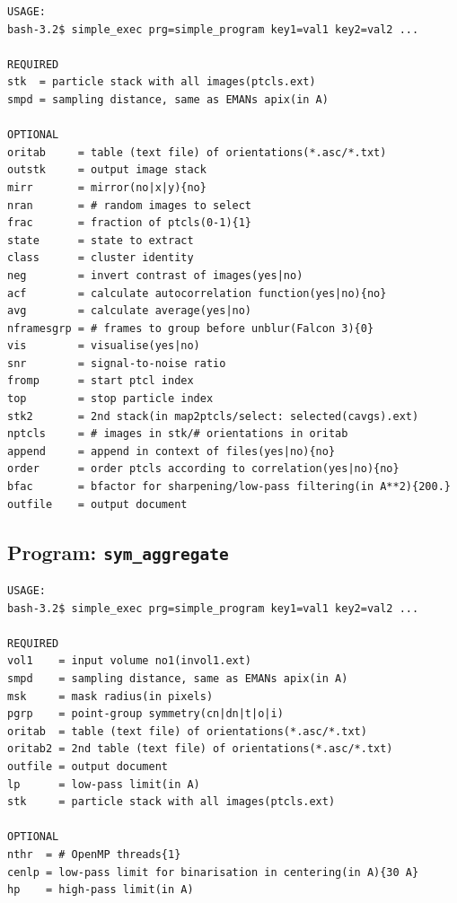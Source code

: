 \documentclass[a4paper,11pt]{article}
\newcommand{\prgname}[1]{\textcolor{NavyBlue}{\texttt{#1}}}
\begin{document}
\begin{verbatim}
USAGE:
bash-3.2$ simple_exec prg=simple_program key1=val1 key2=val2 ...

REQUIRED
stk  = particle stack with all images(ptcls.ext)
smpd = sampling distance, same as EMANs apix(in A)

OPTIONAL
oritab     = table (text file) of orientations(*.asc/*.txt)
outstk     = output image stack
mirr       = mirror(no|x|y){no}
nran       = # random images to select
frac       = fraction of ptcls(0-1){1}
state      = state to extract
class      = cluster identity
neg        = invert contrast of images(yes|no)
acf        = calculate autocorrelation function(yes|no){no}
avg        = calculate average(yes|no)
nframesgrp = # frames to group before unblur(Falcon 3){0}
vis        = visualise(yes|no)
snr        = signal-to-noise ratio
fromp      = start ptcl index
top        = stop particle index
stk2       = 2nd stack(in map2ptcls/select: selected(cavgs).ext)
nptcls     = # images in stk/# orientations in oritab
append     = append in context of files(yes|no){no}
order      = order ptcls according to correlation(yes|no){no}
bfac       = bfactor for sharpening/low-pass filtering(in A**2){200.}
outfile    = output document
\end{verbatim}

\subsection{Program: \prgname{sym\_aggregate}}
\label{sym_aggregate}
\begin{verbatim}
USAGE:
bash-3.2$ simple_exec prg=simple_program key1=val1 key2=val2 ...

REQUIRED
vol1    = input volume no1(invol1.ext)
smpd    = sampling distance, same as EMANs apix(in A)
msk     = mask radius(in pixels)
pgrp    = point-group symmetry(cn|dn|t|o|i)
oritab  = table (text file) of orientations(*.asc/*.txt)
oritab2 = 2nd table (text file) of orientations(*.asc/*.txt)
outfile = output document
lp      = low-pass limit(in A)
stk     = particle stack with all images(ptcls.ext)

OPTIONAL
nthr  = # OpenMP threads{1}
cenlp = low-pass limit for binarisation in centering(in A){30 A}
hp    = high-pass limit(in A)
\end{verbatim}
\end{document}
